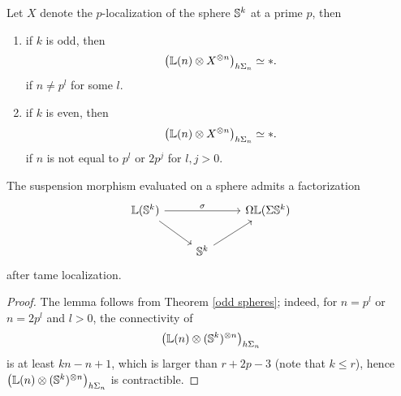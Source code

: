  
 \begin{theorem}
 	\cite[Theorem 3.13, Theorem 4.4]{Arone-Mahowald}
 	\label{odd spheres}
 	Let $X$ denote the $p$-localization of the sphere ${\mathbb{S}}^k$ at a prime $p$, then
 	\begin{enumerate}
 		\item if $k$ is odd, then 
 			$$
 			\big({\mathbb{L}}(n)\otimes X^{\otimes n}
 			\big)_{h\Sigma_n}
 			\simeq *.
 			$$
 			if $n\neq p^l$ for some $l$.
 		\item if $k$ is even, then 
 			$$
 			\big({\mathbb{L}}(n)\otimes X^{\otimes n}
 			\big)_{h\Sigma_n}
 			\simeq *.
 			$$
 			if $n$ is not equal to $p^l$ or $2p^j$ for $l, j>0$.
 	\end{enumerate} 	
 \end{theorem}
 \begin{lemma}
 
 	The suspension morphism evaluated on a sphere admits a factorization
\[
\begin{tikzcd}
	 \BL(\BS^{k}) &   &  \Omega \BL (\Sigma \BS^{k})\\
	& \BS^{k}  &
	\arrow[from=1-1, to = 1-3, "\sigma"]
	\arrow[from=1-1 , to =2-2]
	\arrow[from=2-2, to=1-3]
\end{tikzcd}
\]
after tame localization.
\end{lemma}
\begin{proof}
	The lemma follows from Theorem \ref{odd spheres}; indeed, for $n=p^l$ or $n=2p^l$ and $l>0$, the connectivity of
	\[
	\big(
	{\mathbb{L}}(n)\otimes ({\mathbb{S}}^{k})^{\otimes n}
	\big)_{h\Sigma_n}
	\]
	is at least $kn-n+1$, which is larger than $r+2p-3$ (note that $k\leq r$), hence 
	$\big(
	{\mathbb{L}}(n)\otimes ({\mathbb{S}}^{k})^{\otimes n}
	\big)_{h\Sigma_n}$ is contractible.
	
	\end{proof}

